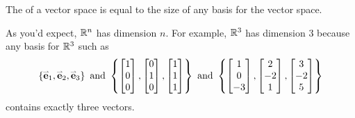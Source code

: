 \begin{definition}
  The  of a vector space is equal to the size
  of any basis for the vector space.

  \vspace{1em}

  As you'd expect, \(\mathbb{R}^n\) has dimension \(n\).
  For example, \(\mathbb{R}^3\) has dimension \(3\) because any basis for \(\mathbb{R}^3\)
  such as
  \[
    \left\{\mathbf{\accentset{\rightharpoonup}{e}}_1,\mathbf{\accentset{\rightharpoonup}{e}}_2,\mathbf{\accentset{\rightharpoonup}{e}}_3\right\}
      \text{ and }
    \left\{
      \begin{bmatrix}1\\0\\0\end{bmatrix},
      \begin{bmatrix}0\\1\\0\end{bmatrix},
      \begin{bmatrix}1\\1\\1\end{bmatrix}
    \right\}
      \text{ and }
    \left\{
      \begin{bmatrix}1\\0\\-3\end{bmatrix},
      \begin{bmatrix}2\\-2\\1\end{bmatrix},
      \begin{bmatrix}3\\-2\\5\end{bmatrix}
    \right\}
  \]
  contains exactly three vectors.
\end{definition}


